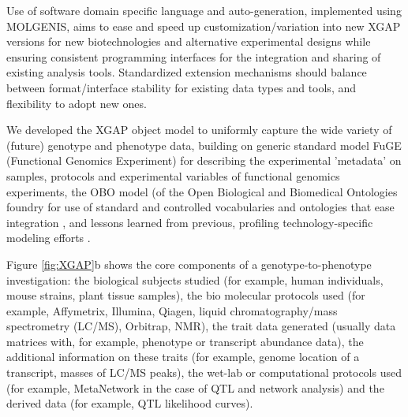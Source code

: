 Use of software domain specific language and auto-generation, implemented using MOLGENIS, aims to ease 
and speed up customization/variation into new XGAP versions for new biotechnologies and alternative 
experimental designs while ensuring consistent programming interfaces for the integration and sharing 
of existing analysis tools. Standardized extension mechanisms should balance between format/interface 
stability for existing data types and tools, and flexibility to adopt new ones.

We developed the XGAP object model to uniformly capture the wide variety of (future) genotype and phenotype data, building 
on generic standard model FuGE (Functional Genomics Experiment) \cite{Jones:2007} for describing 
the experimental 'metadata' on samples, protocols and experimental variables of functional genomics 
experiments, the OBO model (of the Open Biological and Biomedical Ontologies foundry for use of 
standard and controlled vocabularies and ontologies that ease integration \cite{Smith:2007}, 
and lessons learned from previous, profiling technology-specific modeling efforts \cite{Brazma:2006}.

Figure \ref{fig:XGAP}b shows the core components of a genotype-to-phenotype investigation: the biological 
subjects studied (for example, human individuals, mouse strains, plant tissue samples), the 
bio molecular protocols used (for example, Affymetrix, Illumina, Qiagen, liquid 
chromatography/mass spectrometry (LC/MS), Orbitrap, NMR), the trait data generated (usually 
data matrices with, for example, phenotype or transcript abundance data), the additional 
information on these traits (for example, genome location of a transcript, masses of LC/MS peaks), 
the wet-lab or computational protocols used (for example, MetaNetwork \cite{Fu:2007} in the case of QTL and
network analysis) and the derived data (for example, QTL likelihood curves).

